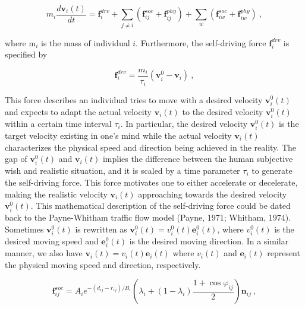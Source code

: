 \documentclass{article}
\begin{document}
%
\begin{equation}\label{Eq_Newton2ndLaw}
    m_i \frac{d \mathbf{v}_i(t)}{dt} = \mathbf{f}_i^{drv} +
	\sum_{j \ne i} \left( \mathbf{f}_{ij}^{soc} + \mathbf{f}_{ij}^{phy} \right) +
	\sum_{w} \left( \mathbf{f}^{soc}_{iw} + \mathbf{f}^{phy}_{iw} \right) ~,
\end{equation}
%

where $\mathrm{m}_i$ is the mass of individual $i$. Furthermore, the self-driving force $\mathbf{f}_i^{drv}$ is specified by

%
\begin{equation}\label{Eq_self_driving_force}
  \mathbf{f}_i^{drv} = \frac{m_i}{\tau_i} \left( \mathbf{v}_i^0 -
    \mathbf{v}_i\right) ~,
\end{equation}
%

This force describes an individual tries to move with a desired velocity $\mathbf{v}_i^0(t)$ and expects to adapt the actual velocity $\mathbf{v}_i(t)$ to the desired velocity $\mathbf{v}_i^0(t)$ within a certain time interval $\tau_i$. In particular, the desired velocity $\mathbf{v}_i^0(t)$ is the target velocity existing in one's mind while the actual velocity $\mathbf{v}_i(t)$ characterizes the physical speed and direction being achieved in the reality.  The gap of $\mathbf{v}_i^0(t)$ and $\mathbf{v}_i(t)$ implies the difference between the human subjective wish and realistic situation, and it is scaled by a time parameter $\tau_i$ to generate the self-driving force.  This force motivates one to either accelerate or decelerate, making the realistic velocity $\mathbf{v}_i(t)$ approaching towards the desired velocity $\mathbf{v}_i^0(t)$.  This mathematical description of the self-driving force could be dated back to the Payne-Whitham traffic flow model (Payne, 1971; Whitham, 1974).  Sometimes $\mathbf{v}_i^0(t)$ is rewritten as $\mathbf{v}_i^0(t) = v_i^0(t)\mathbf{e}_i^0(t)$, where $v_i^0(t)$ is the desired moving speed and $\mathbf{e}_i^0(t)$ is the desired moving direction.  In a similar manner, we also have $\mathbf{v}_i(t) = v_i(t)\mathbf{e}_i(t)$ where $v_i(t)$ and $\mathbf{e}_i(t)$ represent the physical moving speed and direction, respectively.


%
\begin{equation}\label{Eq_socialforce}
 \mathbf{f}_{ij}^{soc} = A_i e^{-(d_{ij}-r_{ij})/B_i }
 \left ( \lambda_i + (1-\lambda_i) \frac{1 + \cos \varphi_{ij}}{2}
 \right )  \mathbf{n}_{ij} ~,
\end{equation}
%
\end{document}
